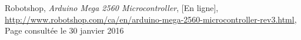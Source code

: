  Robotshop, \textit{Arduino Mega 2560 Microcontroller}, [En ligne], \url{http://www.robotshop.com/ca/en/arduino-mega-2560-microcontroller-rev3.html}, Page consultée le 30 janvier 2016
